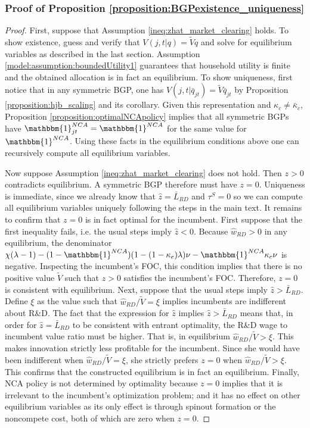 \documentclass[11pt,english]{article}
\theoremstyle{definition}
\begin{document}
\subsubsection{Proof of Proposition \ref{proposition:BGPexistence_uniqueness}}\label{appendix:proofs:proposition:BGPexistence_uniqueness}

\begin{proof}
	First, suppose that Assumption \ref{ineq:zhat_market_clearing} holds. To show existence, guess and verify that $V(j,t|q) = \tilde{V} q$ and solve for equilibrium variables as described in the last section. Assumption \ref{model:assumption:boundedUtility1} guarantees that household utility is finite and the obtained allocation is in fact an equilibrium. To show uniqueness, first notice that in any symmetric BGP, one has $V(j,t|\bar{q}_{jt}) = \tilde{V}\bar{q}_{jt}$ by Proposition \ref{proposition:hjb_scaling} and its corollary. Given this representation and $\kappa_c \ne \bar{\kappa}_c$, Proposition \ref{proposition:optimalNCApolicy} implies that all symmetric BGPs have $\mathbbm{1}^{NCA}_{jt} = \mathbbm{1}^{NCA}$ for the same value for $\mathbbm{1}^{NCA}$. Using these facts in the equilibrium conditions above one can recursively compute all equilibrium variables.
	
	Now suppose Assumption \ref{ineq:zhat_market_clearing} does not hold. Then $z > 0$ contradicts equilibrium. A symmetric BGP therefore must have $z = 0$. Uniqueness is immediate, since we already know that $\hat{z} = \bar{L}_{RD}$ and $\tau^S = 0$ so we can compute all equilibrium variables uniquely following the steps in the main text. It remains to confirm that $z = 0$ is in fact optimal for the incumbent. First suppose that the first inequality fails, i.e. the usual steps imply $\hat{z} < 0$. Because $\hat{w}_{RD} > 0$ in any equilibrium, the denominator $\chi(\lambda -1) - (1 - \mathbbm{1}^{NCA})(1 - (1-\kappa_e) \lambda) \nu - \mathbbm{1}^{NCA} \kappa_c \nu $ is negative. Inspecting the incumbent's FOC, this condition implies that there is no positive value $\tilde{V}$ such that $z > 0$ satisfies the incumbent's FOC. Therefore, $z = 0$ is consistent with equilibrium. Next, suppose that the usual steps imply $\hat{z} > \bar{L}_{RD}$. Define $\xi$ as the value such that $\hat{w}_{RD} / \tilde{V} = \xi$ implies incumbents are indifferent about R\&D. The fact that the expression for $\hat{z}$ implies $\hat{z} > \bar{L}_{RD}$ means that, in order for $\hat{z} = \bar{L}_{RD}$ to be consistent with entrant optimality, the R\&D wage to incumbent value ratio must be higher. That is, in equilibrium $\hat{w}_{RD} / \tilde{V} > \xi$. This makes innovation strictly less profitable for the incumbent. Since she would have been indifferent when $\hat{w}_{RD} / \tilde{V} = \xi$, she strictly prefers $z = 0$ when $\hat{w}_{RD} / \tilde{V}> \xi$. This confirms that the constructed equilibrium is in fact an equilibrium. Finally, NCA policy is not determined by optimality because $z = 0$ implies that it is irrelevant to the incumbent's optimization problem; and it has no effect on other equilibrium variables as its only effect is through spinout formation or the noncompete cost, both of which are zero when $z = 0$.
\end{proof}
\end{document}
